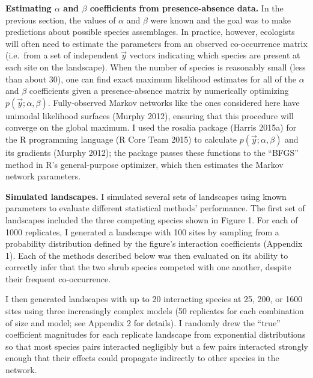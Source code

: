 \documentclass[12pt,]{article}
\begin{document}
\begin{spacing}{1.9}
\begin{flushleft}
\noindent \textbf{Estimating $\alpha$ and $\beta$ coefficients from presence-absence data.}
In the previous section, the values of \(\alpha\) and \(\beta\) were
known and the goal was to make predictions about possible species
assemblages. In practice, however, ecologists will often need to
estimate the parameters from an observed co-occurrence matrix (i.e.~from
a set of independent \(\vec{y}\) vectors indicating which species are
present at each site on the landscape). When the number of species is
reasonably small (less than about 30), one can find exact maximum
likelihood estimates for all of the \(\alpha\) and \(\beta\)
coefficients given a presence-absence matrix by numerically optimizing
\(p(\vec{y}; \alpha, \beta)\). Fully-observed Markov networks like the
ones considered here have unimodal likelihood surfaces (Murphy 2012),
ensuring that this procedure will converge on the global maximum. I used
the rosalia package (Harris 2015a) for the R programming language (R
Core Team 2015) to calculate \(p(\vec{y}; \alpha, \beta)\) and its
gradients (Murphy 2012); the package passes these functions to the
``BFGS'' method in R's general-purpose optimizer, which then estimates
the Markov network parameters.

\noindent \textbf{Simulated landscapes.} I simulated several sets of
landscapes using known parameters to evaluate different statistical
methods' performance. The first set of landscapes included the three
competing species shown in Figure 1. For each of 1000 replicates, I
generated a landscape with 100 sites by sampling from a probability
distribution defined by the figure's interaction coefficients (Appendix
1). Each of the methods described below was then evaluated on its
ability to correctly infer that the two shrub species competed with one
another, despite their frequent co-occurrence.

I then generated landscapes with up to 20 interacting species at 25,
200, or 1600 sites using three increasingly complex models (50
replicates for each combination of size and model; see Appendix 2 for
details). I randomly drew the ``true'' coefficient magnitudes for each
replicate landscape from exponential distributions so that most species
pairs interacted negligibly but a few pairs interacted strongly enough
that their effects could propagate indirectly to other species in the
network.


\end{flushleft}
\end{spacing}
\end{document}
